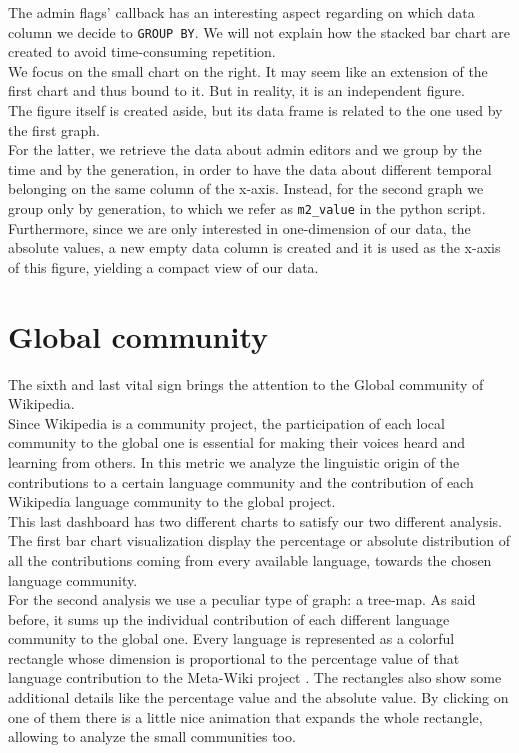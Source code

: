 The admin flags' callback has an interesting aspect regarding on which data column we decide to \verb#GROUP BY#. We will not explain how the stacked bar chart are created to avoid time-consuming repetition.\\
We focus on the small chart on the right. It may seem like an extension of the first chart and thus bound to it. But in reality, it is an independent figure.\\
The figure itself is created aside, but its data frame is related to the one used by the first graph.\\ 
For the latter, we retrieve the data about admin editors and we group by the time and by the generation, in order to have the data about different temporal belonging on the same column of the x-axis. Instead, for the second graph we group only by generation, to which we refer as \verb#m2_value# in the python script.
Furthermore, since we are only interested in one-dimension of our data, the absolute values, a new empty data column is created and it is used as the x-axis of this figure, yielding a compact view of our data.

\section{Global community}
\label{sec:global_community}

The sixth and last vital sign brings the attention to the Global community of Wikipedia. \\
Since Wikipedia is a community project, the participation of each local community to the global one is essential for making their voices heard and learning from others. In this metric we analyze the linguistic origin of the contributions to a certain language community and the contribution of each Wikipedia language community to the global project.\\
This last dashboard has two different charts to satisfy our two different analysis.\\
The first bar chart visualization display the percentage or absolute distribution of all the contributions coming from every available language, towards the chosen language community.\\
For the second analysis we use a peculiar type of graph: a tree-map. As said before, it sums up the individual contribution of each different language community to the global one. Every language is represented as a colorful rectangle whose dimension is proportional to the percentage value of that language contribution to the Meta-Wiki project \cite{meta}. The rectangles also show some additional details like the percentage value and the absolute value. By clicking on one of them there is a little nice animation that expands the whole rectangle, allowing to analyze the small communities too.

